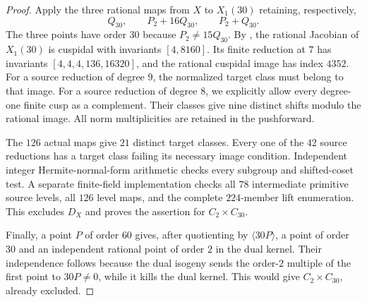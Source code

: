 \begin{proof}
Apply the three rational maps from $X$ to $X_1(30)$ retaining,
respectively,
\[
 Q_{30},\qquad P_2+16Q_{30},\qquad P_2+Q_{30}.
\]
The three points have order $30$ because $P_2\ne15Q_{30}$.
By \cite[Theorem~4.13 and Table~2]{DEHMZ}, the rational Jacobian of
$X_1(30)$ is cuspidal with invariants $[4,8160]$. Its finite
reduction at $7$ has invariants $[4,4,4,136,16320]$, and the rational
cuspidal image has index $4352$.
For a source reduction of degree $9$, the normalized target class
must belong to that image. For a source reduction of degree $8$,
we explicitly allow every degree-one finite cusp as a complement.
Their classes give nine distinct shifts modulo the rational image.
All norm multiplicities are retained in the pushforward.

The $126$ actual maps give $21$ distinct target classes. Every one
of the $42$ source reductions has a target class failing its
necessary image condition. Independent integer Hermite-normal-form
arithmetic checks every subgroup and shifted-coset test.
A separate finite-field implementation checks all $78$ intermediate
primitive source levels, all $126$ level maps, and the complete
$224$-member lift enumeration. This excludes $D_X$ and proves the
assertion for $C_2\times C_{30}$.

Finally, a point $P$ of order $60$ gives, after quotienting by
$\langle30P\rangle$, a point of order $30$ and an independent rational
point of order $2$ in the dual kernel. Their independence follows
because the dual isogeny sends the order-$2$ multiple of the first
point to $30P\ne0$, while it kills the dual kernel. This would give
$C_2\times C_{30}$, already excluded.
\end{proof}
